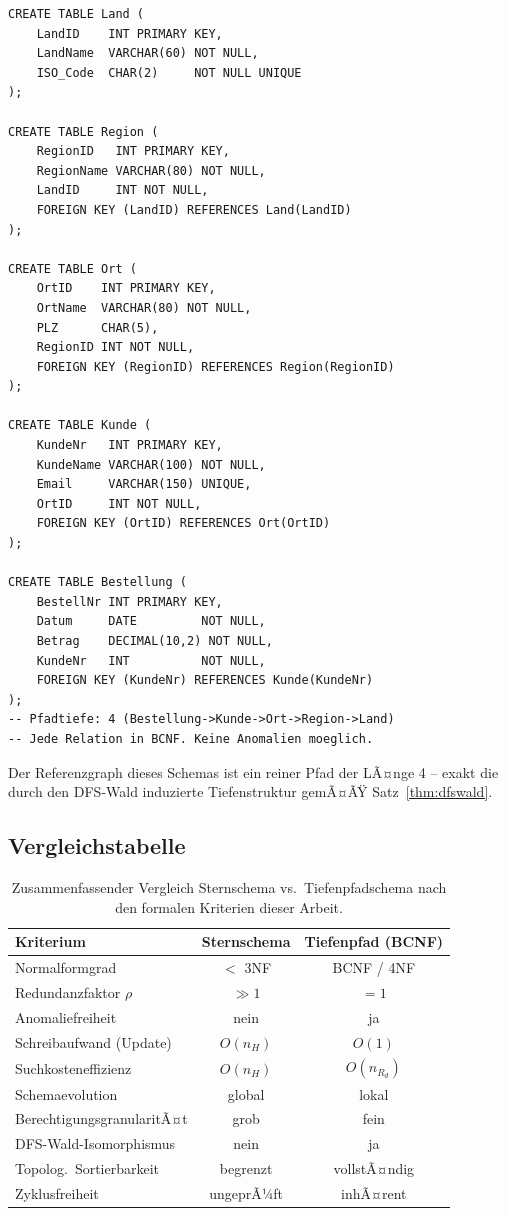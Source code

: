 ﻿\documentclass[12pt,a4paper]{article}
\theoremstyle{definition}
\theoremstyle{remark}
\begin{document}
\begin{lstlisting}[caption={Korrekte Tiefenpfadstruktur: BCNF-konformes Schema},label=lst:tief]
CREATE TABLE Land (
    LandID    INT PRIMARY KEY,
    LandName  VARCHAR(60) NOT NULL,
    ISO_Code  CHAR(2)     NOT NULL UNIQUE
);

CREATE TABLE Region (
    RegionID   INT PRIMARY KEY,
    RegionName VARCHAR(80) NOT NULL,
    LandID     INT NOT NULL,
    FOREIGN KEY (LandID) REFERENCES Land(LandID)
);

CREATE TABLE Ort (
    OrtID    INT PRIMARY KEY,
    OrtName  VARCHAR(80) NOT NULL,
    PLZ      CHAR(5),
    RegionID INT NOT NULL,
    FOREIGN KEY (RegionID) REFERENCES Region(RegionID)
);

CREATE TABLE Kunde (
    KundeNr   INT PRIMARY KEY,
    KundeName VARCHAR(100) NOT NULL,
    Email     VARCHAR(150) UNIQUE,
    OrtID     INT NOT NULL,
    FOREIGN KEY (OrtID) REFERENCES Ort(OrtID)
);

CREATE TABLE Bestellung (
    BestellNr INT PRIMARY KEY,
    Datum     DATE         NOT NULL,
    Betrag    DECIMAL(10,2) NOT NULL,
    KundeNr   INT          NOT NULL,
    FOREIGN KEY (KundeNr) REFERENCES Kunde(KundeNr)
);
-- Pfadtiefe: 4 (Bestellung->Kunde->Ort->Region->Land)
-- Jede Relation in BCNF. Keine Anomalien moeglich.
\end{lstlisting}

Der Referenzgraph dieses Schemas ist ein reiner Pfad der LÃ¤nge 4 --
exakt die durch den DFS-Wald induzierte Tiefenstruktur gemÃ¤ÃŸ
Satz~\ref{thm:dfswald}.

\subsection{Vergleichstabelle}

\begin{table}[H]
\centering
\renewcommand{\arraystretch}{1.35}
\begin{tabular}{lcc}
\toprule
\textbf{Kriterium} & \textbf{Sternschema} & \textbf{Tiefenpfad (BCNF)} \\
\midrule
Normalformgrad            & $<$ 3NF   & BCNF / 4NF \\
Redundanzfaktor $\rho$    & $\gg 1$   & $= 1$ \\
Anomaliefreiheit          & nein      & ja \\
Schreibaufwand (Update)   & $O(n_H)$  & $O(1)$ \\
Suchkosteneffizienz       & $O(n_H)$  & $O(n_{R_d})$ \\
Schemaevolution           & global    & lokal \\
BerechtigungsgranularitÃ¤t & grob      & fein \\
DFS-Wald-Isomorphismus    & nein      & ja \\
Topolog.\ Sortierbarkeit  & begrenzt  & vollstÃ¤ndig \\
Zyklusfreiheit            & ungeprÃ¼ft & inhÃ¤rent \\
\bottomrule
\end{tabular}
\caption{Zusammenfassender Vergleich Sternschema vs.\ Tiefenpfadschema
nach den formalen Kriterien dieser Arbeit.}
\label{tab:vergleich}
\end{table}
\end{document}
